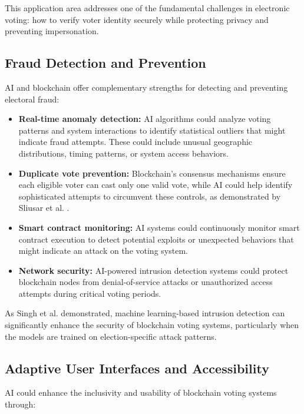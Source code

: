 \documentclass[conference]{IEEEtran}
\begin{document}
This application area addresses one of the fundamental challenges in electronic voting: how to verify voter identity securely while protecting privacy and preventing impersonation.

\subsection{Fraud Detection and Prevention}
AI and blockchain offer complementary strengths for detecting and preventing electoral fraud:

\begin{itemize}
    \item \textbf{Real-time anomaly detection:} AI algorithms could analyze voting patterns and system interactions to identify statistical outliers that might indicate fraud attempts. These could include unusual geographic distributions, timing patterns, or system access behaviors.
    
    \item \textbf{Duplicate vote prevention:} Blockchain's consensus mechanisms ensure each eligible voter can cast only one valid vote, while AI could help identify sophisticated attempts to circumvent these controls, as demonstrated by Sliusar et al. \cite{b4}.
    
    \item \textbf{Smart contract monitoring:} AI systems could continuously monitor smart contract execution to detect potential exploits or unexpected behaviors that might indicate an attack on the voting system.
    
    \item \textbf{Network security:} AI-powered intrusion detection systems could protect blockchain nodes from denial-of-service attacks or unauthorized access attempts during critical voting periods.
\end{itemize}

As Singh et al. \cite{b5} demonstrated, machine learning-based intrusion detection can significantly enhance the security of blockchain voting systems, particularly when the models are trained on election-specific attack patterns.

\subsection{Adaptive User Interfaces and Accessibility}
AI could enhance the inclusivity and usability of blockchain voting systems through:
\end{document}
